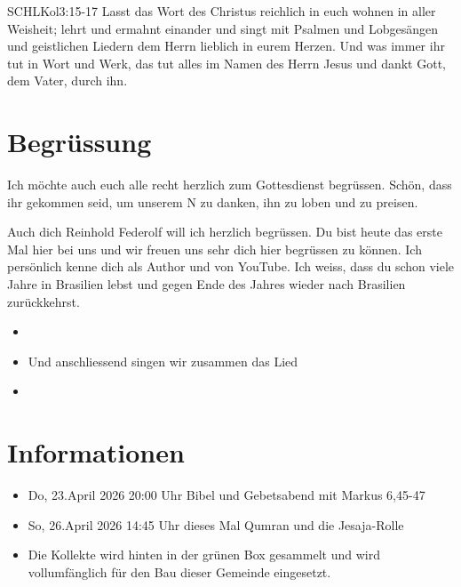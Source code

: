 \documentclass[fontsize=14pt]{../../inc/mybib}
\newcommand{\Name}{Reinhold Federolf}
\begin{document}
\begin{bibelbox}{SCHL}{Kol}{3:15-17}
    Lasst das Wort des Christus reichlich in euch wohnen in aller Weisheit; lehrt und ermahnt einander und singt mit Psalmen und Lobgesängen und geistlichen Liedern dem Herrn lieblich in eurem Herzen. Und was immer ihr tut in Wort und Werk, das tut alles im Namen des Herrn Jesus und dankt Gott, dem Vater, durch ihn.
\end{bibelbox}
\section{Begrüssung}
Ich möchte auch euch alle recht herzlich zum Gottesdienst begrüssen. Schön, dass ihr gekommen seid, um unserem \herr N zu danken, ihn zu loben und zu preisen.

Auch dich \Name{} will ich herzlich begrüssen. Du bist heute das erste Mal hier bei uns und wir freuen uns sehr dich hier begrüssen zu können. Ich persönlich kenne dich als Author und von YouTube. Ich weiss, dass du schon viele Jahre in Brasilien lebst und gegen Ende des Jahres wieder nach Brasilien zurückkehrst.
\begin{itemize}
    \item[] 
    \item[] Und anschliessend singen wir zusammen das Lied
    \item[] 
\end{itemize}

\section{Informationen}
\begin{itemize}
    \item {} Do, 23.April 2026 20:00 Uhr Bibel und Gebetsabend mit Markus 6,45-47
    \item {} So, 26.April 2026 14:45 Uhr dieses Mal Qumran und die Jesaja-Rolle

    \item {} Die Kollekte wird hinten in der grünen Box gesammelt und wird vollumfänglich für den Bau dieser Gemeinde eingesetzt.
\end{itemize}
\end{document}
